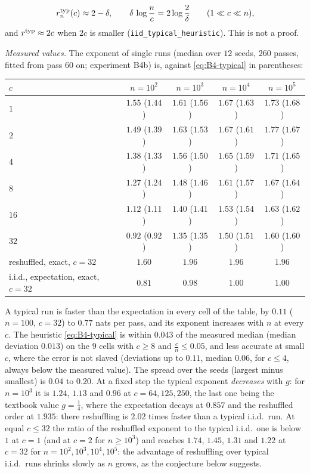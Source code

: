 \begin{enumerate}[label=(\alph*),nosep]
\begin{equation}\label{eq:B4-typical}
r^{\rm typ}_n(c)\approx2-\delta,\qquad \delta\,\log\frac nc=2\log\frac2\delta\qquad(1\ll c\ll n),
\end{equation}
and $r^{\rm typ}\approx2c$ when $2c$ is smaller (\texttt{iid\_typical\_heuristic}). This is not a proof.
\end{enumerate}
\emph{Measured values.} The exponent of single runs (median over $12$ seeds, $260$ passes, fitted from pass $60$ on; experiment B4b) is, against \eqref{eq:B4-typical} in parentheses:
\begin{center}
\footnotesize
\begin{tabular}{@{}lcccc@{}}
\toprule
$c$ & $n=10^2$ & $n=10^3$ & $n=10^4$ & $n=10^5$ \\
\midrule
$1$ & $1.55$ ($1.44$) & $1.61$ ($1.56$) & $1.67$ ($1.63$) & $1.73$ ($1.68$) \\
$2$ & $1.49$ ($1.39$) & $1.63$ ($1.53$) & $1.67$ ($1.61$) & $1.77$ ($1.67$) \\
$4$ & $1.38$ ($1.33$) & $1.56$ ($1.50$) & $1.65$ ($1.59$) & $1.71$ ($1.65$) \\
$8$ & $1.27$ ($1.24$) & $1.48$ ($1.46$) & $1.61$ ($1.57$) & $1.67$ ($1.64$) \\
$16$ & $1.12$ ($1.11$) & $1.40$ ($1.41$) & $1.53$ ($1.54$) & $1.63$ ($1.62$) \\
$32$ & $0.92$ ($0.92$) & $1.35$ ($1.35$) & $1.50$ ($1.51$) & $1.60$ ($1.60$) \\
\midrule
reshuffled, exact, $c=32$ & $1.60$ & $1.96$ & $1.96$ & $1.96$ \\
i.i.d., expectation, exact, $c=32$ & $0.81$ & $0.98$ & $1.00$ & $1.00$ \\
\bottomrule
\end{tabular}
\end{center}
\noindent A typical run is faster than the expectation in every cell of the table, by $0.11$ ($n=100$, $c=32$) to $0.77$ nats per pass, and its exponent increases with $n$ at every $c$. The heuristic \eqref{eq:B4-typical} is within $0.043$ of the measured median (median deviation $0.013$) on the $9$ cells with $c\ge8$ and $\frac cn\le0.05$, and less accurate at small $c$, where the error is not slaved (deviations up to $0.11$, median $0.06$, for $c\le4$, always below the measured value). The spread over the seeds (largest minus smallest) is $0.04$ to $0.20$. At a fixed step the typical exponent \emph{decreases} with $g$: for $n=10^3$ it is $1.24$, $1.13$ and $0.96$ at $c=64,125,250$, the last one being the textbook value $g=\frac14$, where the expectation decays at $0.857$ and the reshuffled order at $1.935$: there reshuffling is $2.02$ times faster than a typical i.i.d.\ run. At equal $c\le32$ the ratio of the reshuffled exponent to the typical i.i.d.\ one is below $1$ at $c=1$ (and at $c=2$ for $n\ge10^3$) and reaches $1.74$, $1.45$, $1.31$ and $1.22$ at $c=32$ for $n=10^2,10^3,10^4,10^5$: the advantage of reshuffling over typical i.i.d.\ runs shrinks slowly as $n$ grows, as the conjecture below suggests.


